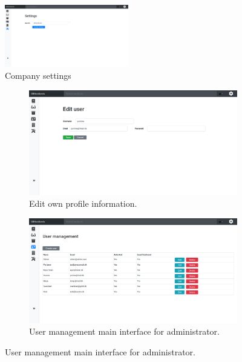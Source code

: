 \begin{figure}[H]
	\centering
		\includegraphics[width=0.48\textwidth]{billeder/iteration3Prototyper/Setting.png}
		\caption{Company settings}
		\label{fig:5-setting}
\end{figure}

\begin{figure}[H]
	\centering
	\begin{subfigure}[b]{0.48\textwidth}
		\includegraphics[width=\textwidth]{billeder/iteration3Prototyper/EditU.png}
		\caption{Edit own profile information.}
		\label{fig:5-Add}
	\end{subfigure}
	\quad
	\begin{subfigure}[b]{0.48\textwidth}
		\includegraphics[width=\textwidth]{billeder/iteration3Prototyper/UserMan.png}
		\caption{User management main interface for administrator.}
		\label{fig:5-UManagement}
	\end{subfigure}
\end{figure}
